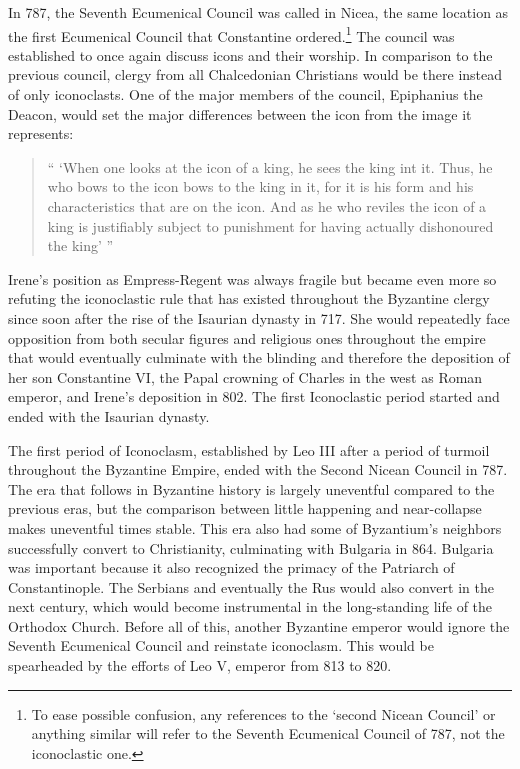 \documentclass[12pt]{article}
\begin{document}
    In 787, the Seventh Ecumenical Council was called in Nicea, the same location as the first Ecumenical Council that Constantine ordered.\footnote{To ease possible confusion, any references to the  `second Nicean Council' or anything similar will refer to the Seventh Ecumenical Council of 787, not the iconoclastic one.}
    The council was established to once again discuss icons and their worship. In comparison to the previous council, clergy from all Chalcedonian Christians would be there instead of only iconoclasts. One of the major members of the council, Epiphanius the Deacon, would set the major differences between the icon from the image it represents: \begin{quote}
        `` `When one looks at the icon of a king, he sees the king int it. Thus, he who bows to the icon bows to the king in it, for it is his form and his characteristics that are on the icon. And as he who reviles the icon of a king is justifiably subject to punishment for having actually dishonoured the king' ''~\cite[p. 129]{IconIdolatry}
    \end{quote}\noindent
    Irene's position as Empress-Regent was always fragile but became even more so refuting the iconoclastic rule that has existed throughout the Byzantine clergy since soon after the rise of the Isaurian dynasty in 717. She would repeatedly face opposition from both secular figures and religious ones throughout the empire that would eventually culminate with the blinding and therefore the deposition of her son Constantine VI, the Papal crowning of Charles in the west as Roman emperor, and Irene's deposition in 802. The first Iconoclastic period started and ended with the Isaurian dynasty. \

    The first period of Iconoclasm, established by Leo III after a period of turmoil throughout the Byzantine Empire, ended with the Second Nicean Council in 787. The era that follows in Byzantine history is largely uneventful compared to the previous eras, but the comparison between little happening and near-collapse makes uneventful times stable. This era also had some of Byzantium's neighbors successfully convert to Christianity, culminating with Bulgaria in 864.\cite[p.12]{BriefByzantine} Bulgaria was important because it also recognized the primacy of the Patriarch of Constantinople. The Serbians and eventually the Rus would also convert in the next century, which would become instrumental in the long-standing life of the Orthodox Church. Before all of this, another Byzantine emperor would ignore the Seventh Ecumenical Council and reinstate iconoclasm. This would be spearheaded by the efforts of Leo V, emperor from 813 to 820. \
\end{document}
